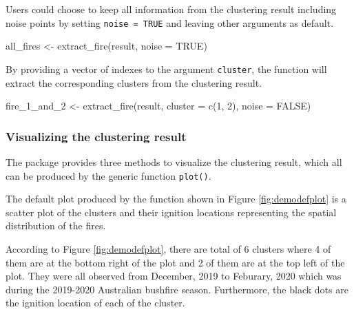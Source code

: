 Users could choose to keep all information from the clustering result
including noise points by setting \texttt{noise\ =\ TRUE} and leaving
other arguments as default.

\begin{Schunk}
\begin{Sinput}
all_fires <- extract_fire(result, noise = TRUE)
\end{Sinput}
\end{Schunk}

By providing a vector of indexes to the argument \texttt{cluster}, the
function will extract the corresponding clusters from the clustering
result.

\begin{Schunk}
\begin{Sinput}
fire_1_and_2 <- extract_fire(result, cluster = c(1, 2), noise = FALSE)
\end{Sinput}
\end{Schunk}

\hypertarget{visualizing-the-clustering-result}{%
\subsubsection{Visualizing the clustering
result}\label{visualizing-the-clustering-result}}

The package provides three methods to visualize the clustering result,
which all can be produced by the generic function \texttt{plot()}.

The default plot produced by the function shown in Figure
\ref{fig:demodefplot} is a scatter plot of the clusters and their
ignition locations representing the spatial distribution of the fires.

According to Figure \ref{fig:demodefplot}, there are total of 6 clusters
where 4 of them are at the bottom right of the plot and 2 of them are at
the top left of the plot. They were all observed from December, 2019 to
Feburary, 2020 which was during the 2019-2020 Australian bushfire
season. Furthermore, the black dots are the ignition location of each of
the cluster.

